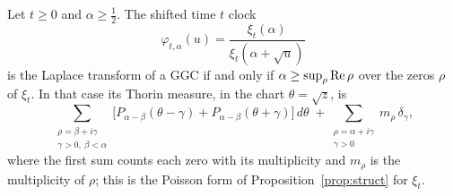 \begin{theorem}\label{cp:thm:transfer}
Let $t\ge0$ and $\alpha\ge\frac12$. The shifted time $t$ clock
\[
\varphi_{t,\alpha}(u)=\frac{\xi_t(\alpha)}{\xi_t(\alpha+\sqrt u)}
\]
is the Laplace transform of a GGC if and only if $\alpha\ge\sup_\rho\operatorname{Re}\rho$ over the zeros $\rho$ of $\xi_t$. In that case its Thorin measure, in the chart $\theta=\sqrt z$, is
\[
\sum_{\substack{\rho=\beta+i\gamma\\ \gamma>0,\ \beta<\alpha}}\big[P_{\alpha-\beta}(\theta-\gamma)+P_{\alpha-\beta}(\theta+\gamma)\big]\,d\theta\;+\sum_{\substack{\rho=\alpha+i\gamma\\ \gamma>0}}m_\rho\,\delta_{\gamma},
\]
where the first sum counts each zero with its multiplicity and $m_\rho$ is the multiplicity of $\rho$; this is the Poisson form of Proposition~\ref{prop:struct} for $\xi_t$.
\end{theorem}

